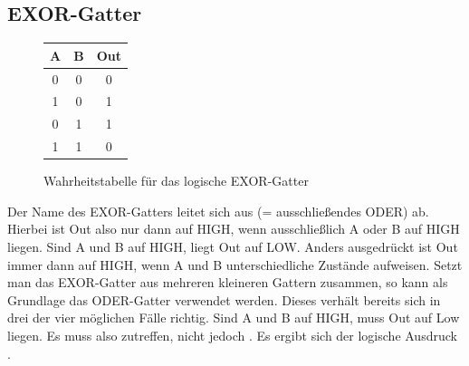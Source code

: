 \subsection{EXOR-Gatter}
\begin{figure}[h]
	\centering
	\hspace{1cm}
	\begin{tabular}{|c|c|c|}
		\hline
		\textbf{A} & \textbf{B} & \textbf{Out} \\
		\hline
		0 & 0 & 0 \\
		1 & 0 & 1 \\
		0 & 1 & 1 \\
		1 & 1 & 0 \\
		\hline
	\end{tabular}
	\caption{Wahrheitstabelle für das logische EXOR-Gatter}
\end{figure}
Der Name des EXOR-Gatters leitet sich aus  (= ausschließendes ODER) ab. Hierbei ist Out also nur dann auf HIGH, wenn ausschließlich A oder B auf HIGH liegen. Sind A und B auf HIGH, liegt Out auf LOW. Anders ausgedrückt ist Out immer dann auf HIGH, wenn A und B unterschiedliche Zustände aufweisen. Setzt man das EXOR-Gatter aus mehreren kleineren Gattern zusammen, so kann als Grundlage das ODER-Gatter verwendet werden. Dieses verhält bereits sich in drei der vier möglichen Fälle richtig. Sind A und B auf HIGH, muss Out auf Low liegen. Es muss also  zutreffen, nicht jedoch . Es ergibt sich der logische Ausdruck .\\
